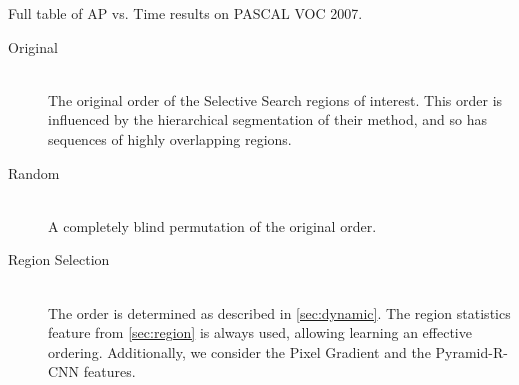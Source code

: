 \begin{table}[ht]
\centering
\caption{
Full table of AP vs. Time results on PASCAL VOC 2007.
}\label{tab:results}
\small{

}
\end{table}

\begin{description}
  \item[Original] \hfill \\
  The original order of the Selective Search regions of interest.
  This order is influenced by the hierarchical segmentation of their method, and so has sequences of highly overlapping regions.
  \item[Random] \hfill \\
  A completely blind permutation of the original order.
  \item[Region Selection] \hfill \\
  The order is determined as described in \autoref{sec:dynamic}.
  The region statistics feature from \autoref{sec:region} is always used, allowing learning an effective ordering.
  Additionally, we consider the Pixel Gradient and the Pyramid-R-CNN features.
\end{description}


